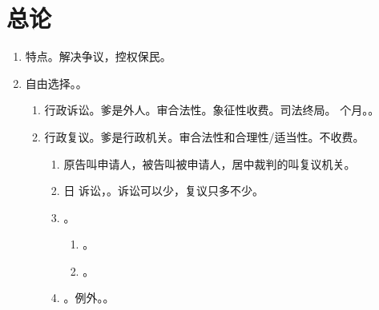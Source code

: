 \section{总论}
\begin{enumerate}
  \item 特点。解决争议，控权保民。
  \item 自由选择。。
        \begin{enumerate}
          \item 行政诉讼。爹是外人。审合法性。象征性收费。司法终局。 个月。。
          \item 行政复议。爹是行政机关。审合法性和合理性/适当性。不收费。
                \begin{enumerate}
                  \item 原告叫申请人，被告叫被申请人，居中裁判的叫复议机关。
                  \item {} 日 \yjt {} \yjt 诉讼，。诉讼可以少，复议只多不少。
                  \item {}。
                        \begin{enumerate}
                          \item {}。
                          \item {}。
                        \end{enumerate}
                  \item {}。例外。。
                \end{enumerate}


\end{enumerate}
\end{enumerate}
